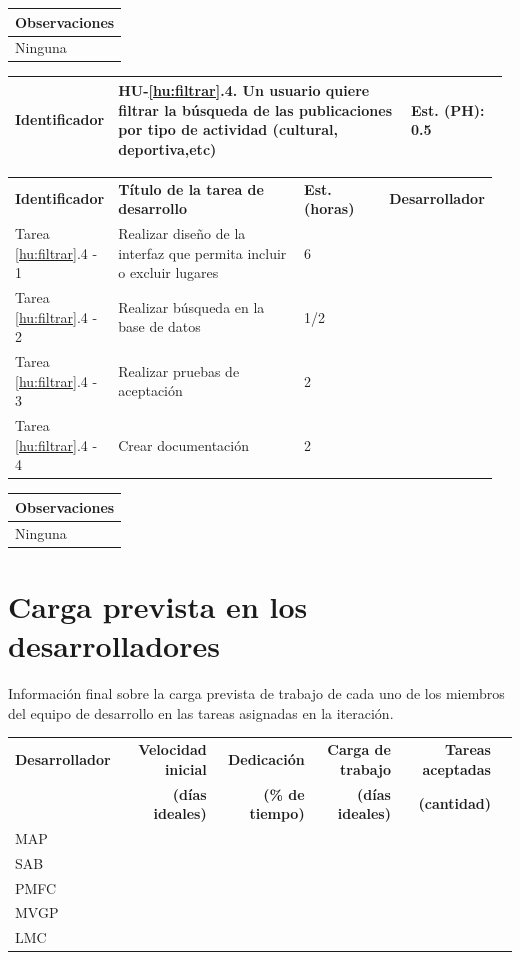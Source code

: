 \documentclass[11pt]{article}
\begin{document}
\begin{longtable}{p{1.028\linewidth}}
	\textbf{Observaciones}\\
	\midrule
	Ninguna\\
	\bottomrule
	\bottomrule
\end{longtable}

\centering
\begin{longtable}{p{0.18\linewidth}|p{0.6\linewidth}|p{0.2\linewidth}}
	\toprule
	\toprule
	\textbf{Identificador} & \textbf{HU-\ref{hu:filtrar}.4}. Un usuario quiere filtrar la búsqueda de las publicaciones por tipo de actividad (cultural, deportiva,etc) & \textbf{Est. (PH):} 0.5 \\
	
	\bottomrule
\end{longtable}

\begin{longtable}{p{0.18\linewidth}|p{0.4\linewidth}|p{0.18\linewidth}|p{0.2\linewidth}}
	\toprule
	\textbf{Identificador} & \textbf{Título de la tarea de desarrollo} & \textbf{Est. (horas)} & \textbf{Desarrollador} \\
	Tarea \ref{hu:filtrar}.4 - 1 & Realizar diseño de la interfaz que permita incluir o excluir lugares & 6 &\\
	Tarea \ref{hu:filtrar}.4 - 2 & Realizar búsqueda en la base de datos & 1/2 & \\
	Tarea \ref{hu:filtrar}.4 - 3 & Realizar pruebas de aceptación & 2 & \\
	Tarea \ref{hu:filtrar}.4 - 4 & Crear documentación & 2 & \\
	\bottomrule
\end{longtable}


\begin{longtable}{p{1.028\linewidth}}
	\textbf{Observaciones}\\
	\midrule
	Ninguna\\
	\bottomrule
	\bottomrule
\end{longtable}

\section{Carga prevista en los desarrolladores}

Información final sobre la carga prevista de trabajo de cada uno de los miembros del equipo de desarrollo en las tareas asignadas en la iteración.

\begin{longtable}{lrrrrr}
  \toprule
  \textbf{Desarrollador} & \textbf{Velocidad inicial} & \textbf{Dedicación} & \textbf{Carga de trabajo} & \textbf{Tareas aceptadas} \\
  & \textbf{(días ideales)} & \textbf{(\% de tiempo)} & \textbf{(días ideales)} & \textbf{ (cantidad)}\\
  \midrule
  MAP &  & \\
  SAB &  & \\
  PMFC \\
  MVGP & & \\
  LMC \\
  \bottomrule
\end{longtable}
\end{document}
